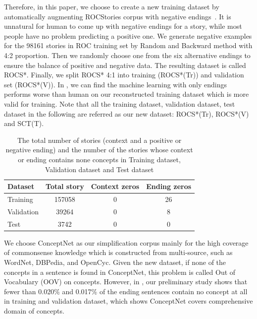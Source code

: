 Therefore, in this paper, we choose to create a new training dataset
by automatically augmenting ROCStories corpus with negative endings~\cite{roemmele2017rnn}.
It is unnatural for human to come up with negative
endings for a story, while most people have no problem predicting a positive
one.
We generate negative examples for the 98161 stories in ROC training set 
by Random and Backward method with 4:2 proportion. Then we randomly choose one 
from the six alternative endings to ensure the balance of positive and negative data. 
The resulting dataset is called ROCS*.
Finally, we split ROCS* 4:1 into training (ROCS*(Tr)) and 
validation set (ROCS*(V)). 
In  , we can find the machine learning with only endings performs
worse than human on our reconstructed training dataset which is more valid for training. 
Note that all the training dataset, 
validation dataset, test dataset in the following are referred as our new dataset: ROCS*(Tr),
ROCS*(V) and SCT(T).


\begin{table}[th!]
\small
\centering
\begin{tabular}{lccc}
\hline
\textbf{Dataset}&Total story&Context zeros& Ending zeros  \\
\hline
Training& 157058 &0&26\\
Validation&39264&0&8\\
Test&3742&0&0\\
\hline
\end{tabular}
\caption{The total number of stories (context and a positive or negative ending) and  the number 
of the stories whose context or ending contains none concepts 
in Training dataset, Validation dataset and Test dataset }
\label{tab:size2}
\end{table}

We choose ConceptNet as our simplification corpus mainly for the high coverage of
commonsense knowledge which is constructed from multi-source, such as 
WordNet, DBPedia, and OpenCyc. 
Given the new dataset, if none of the concepts in a sentence 
is found in ConceptNet, this problem is called 
Out of Vocabulary (OOV) on concepts. 
However, in , our preliminary study shows
 that fewer than 0.020\% and 0.017\% of the ending sentences contain no concept at all in training 
 and validation dataset, which shows ConceptNet covers comprehensive domain of concepts.


